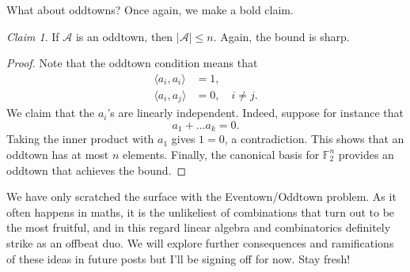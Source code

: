 \documentclass[a4paper, 12pt]{article}
\theoremstyle{definition}
\theoremstyle{plain}
\theoremstyle{remark}
\newtheorem{claim}[definition]{Claim}
\begin{document}
What about oddtowns? Once again, we make a bold claim.

\begin{claim}
    If \( \mathcal{A} \) is an oddtown, then \( \left| \mathcal{A} \right| \leq n \). Again, the bound is sharp.
\end{claim}
\begin{proof}
    Note that the oddtown condition means that
    \begin{equation*}
        \begin{aligned}
            \langle a_i, a_i \rangle &= 1, \\
            \langle a_i, a_j \rangle &= 0, \quad i \neq j.
        \end{aligned}
    \end{equation*}
    We claim that the \( a_i \)'s are linearly independent. Indeed, suppose for instance that
    \begin{equation*}
        a_1 + \dots a_k = 0.
    \end{equation*}
    Taking the inner product with \( a_1 \) gives \( 1 = 0 \), a contradiction. This shows that an oddtown has at most \( n \) elements. Finally, the canonical basis for \( \mathbb{F}_2^n \) provides an oddtown that achieves the bound.
\end{proof}


We have only scratched the surface with the Eventown/Oddtown problem. As it often happens in maths, it is the unlikeliest of combinations that turn out to be the most fruitful, and in this regard linear algebra and combinatorics definitely strike as an offbeat duo. We will explore further consequences and ramifications of these ideas in future posts but I'll be signing off for now. Stay fresh!
\end{document}
